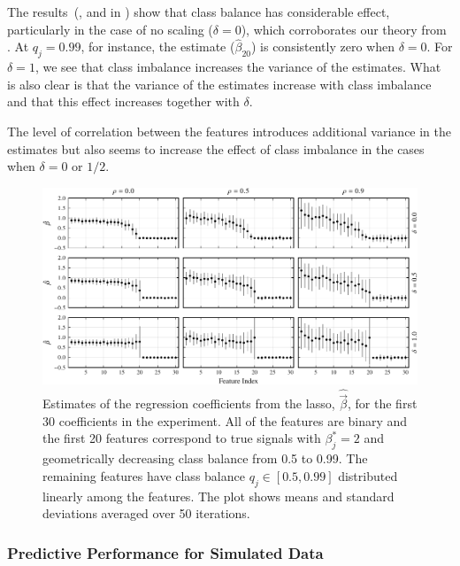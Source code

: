 The results~(, and  in
) show that class balance has considerable effect,
particularly in the case of no scaling (\(\delta = 0\)), which corroborates our theory from
. At \(q_j=0.99\), for instance, the estimate
(\(\hat{\beta}_{20}\)) is consistently zero when \(\delta = 0\). For \(\delta=1\), we see
that class imbalance increases the variance of the estimates. What is also clear is that
the variance of the estimates increase with class imbalance and that this effect increases
together with \(\delta\).

The level of correlation between the features introduces additional variance in the
estimates but also seems to increase the effect of class imbalance in the cases when
\(\delta = 0\) or \(1/2\).

\begin{figure}[htpb]
  \centering
  \includegraphics[]{plots/binary_decreasing.pdf}
  \caption{%
    Estimates of the regression coefficients from the lasso, \(\hat{\vec{\beta}}\), for the
    first 30 coefficients in the experiment. All of the features are binary and the first 20
    features correspond to true signals with \(\beta_j^* = 2\) and geometrically decreasing
    class balance from 0.5 to 0.99. The remaining features have class balance \(q_j \in [0.5,
      0.99]\) distributed linearly among the features. The plot shows means and standard
    deviations averaged over 50 iterations.
  }
  \label{fig:binary-decreasing-full}
\end{figure}

\subsubsection{Predictive Performance for Simulated Data}%
\label{sec:predictive-performance-simulated}

